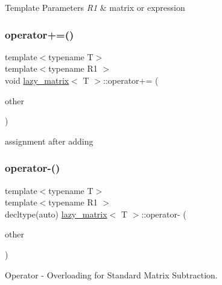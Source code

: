 \begin{DoxyTemplParams}{Template Parameters}
{\em R1} & matrix or expression \\
\hline
\end{DoxyTemplParams}
\mbox{\label{classlazy__matrix_ad095e5ee3870ca98a267961e260321ce}} 
\subsubsection{\texorpdfstring{operator+=()}{operator+=()}}
{\footnotesize\ttfamily template$<$typename T$>$ \\
template$<$typename R1 $>$ \\
void \mbox{\hyperlink{classlazy__matrix}{lazy\+\_\+matrix}}$<$ T $>$\+::operator+= (\begin{DoxyParamCaption}\item[{const R1 \&}]{other }\end{DoxyParamCaption})\hspace{0.3cm}{\ttfamily [inline]}}



assignment after adding 

\mbox{\label{classlazy__matrix_a04ef62e9f2c4395ad0a9e00a0180df9e}} 
\subsubsection{\texorpdfstring{operator-\/()}{operator-()}}
{\footnotesize\ttfamily template$<$typename T$>$ \\
template$<$typename R1 $>$ \\
decltype(auto) \mbox{\hyperlink{classlazy__matrix}{lazy\+\_\+matrix}}$<$ T $>$\+::operator-\/ (\begin{DoxyParamCaption}\item[{const R1 \&}]{other }\end{DoxyParamCaption})\hspace{0.3cm}{\ttfamily [inline]}}



Operator -\/ Overloading for Standard Matrix Subtraction. 


